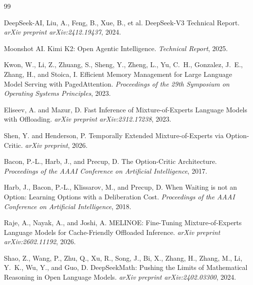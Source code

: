 \documentclass{article}
\begin{document}
\clearpage

\begin{thebibliography}{99}

DeepSeek-AI, Liu, A., Feng, B., Xue, B., et al.
\newblock DeepSeek-V3 Technical Report.
\newblock \emph{arXiv preprint arXiv:2412.19437}, 2024.

Moonshot AI.
\newblock Kimi K2: Open Agentic Intelligence.
\newblock \emph{Technical Report}, 2025.

Kwon, W., Li, Z., Zhuang, S., Sheng, Y., Zheng, L., Yu, C.~H., Gonzalez, J.~E., Zhang, H., and Stoica, I.
\newblock Efficient Memory Management for Large Language Model Serving with PagedAttention.
\newblock \emph{Proceedings of the 29th Symposium on Operating Systems Principles}, 2023.

Eliseev, A. and Mazur, D.
\newblock Fast Inference of Mixture-of-Experts Language Models with Offloading.
\newblock \emph{arXiv preprint arXiv:2312.17238}, 2023.

Shen, Y. and Henderson, P.
\newblock Temporally Extended Mixture-of-Experts via Option-Critic.
\newblock \emph{arXiv preprint}, 2026.

Bacon, P.-L., Harb, J., and Precup, D.
\newblock The Option-Critic Architecture.
\newblock \emph{Proceedings of the AAAI Conference on Artificial Intelligence}, 2017.

Harb, J., Bacon, P.-L., Klissarov, M., and Precup, D.
\newblock When Waiting is not an Option: Learning Options with a Deliberation Cost.
\newblock \emph{Proceedings of the AAAI Conference on Artificial Intelligence}, 2018.

Raje, A., Nayak, A., and Joshi, A.
\newblock MELINOE: Fine-Tuning Mixture-of-Experts Language Models for Cache-Friendly Offloaded Inference.
\newblock \emph{arXiv preprint arXiv:2602.11192}, 2026.

Shao, Z., Wang, P., Zhu, Q., Xu, R., Song, J., Bi, X., Zhang, H., Zhang, M., Li, Y.~K., Wu, Y., and Guo, D.
\newblock DeepSeekMath: Pushing the Limits of Mathematical Reasoning in Open Language Models.
\newblock \emph{arXiv preprint arXiv:2402.03300}, 2024.


\end{thebibliography}
\end{document}
